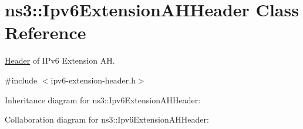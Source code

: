 \hypertarget{classns3_1_1Ipv6ExtensionAHHeader}{}\section{ns3\+:\+:Ipv6\+Extension\+A\+H\+Header Class Reference}
\label{classns3_1_1Ipv6ExtensionAHHeader}


\hyperlink{classns3_1_1Header}{Header} of I\+Pv6 Extension AH.  




{\ttfamily \#include $<$ipv6-\/extension-\/header.\+h$>$}



Inheritance diagram for ns3\+:\+:Ipv6\+Extension\+A\+H\+Header\+:


Collaboration diagram for ns3\+:\+:Ipv6\+Extension\+A\+H\+Header\+:
